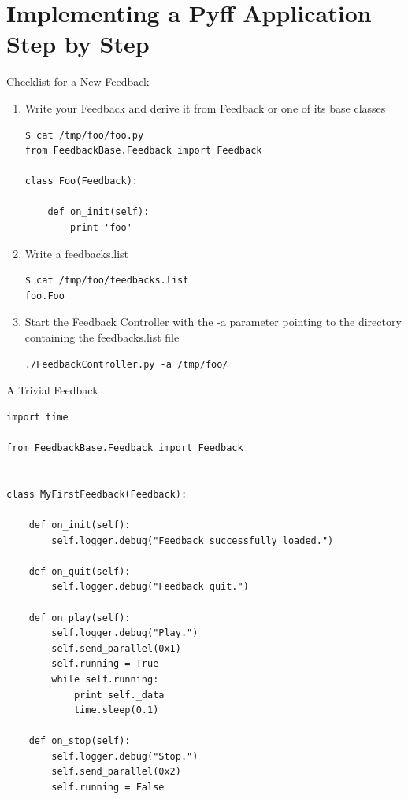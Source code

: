 \documentclass{beamer}
\begin{document}
\section{Implementing a Pyff Application Step by Step}
\begin{frame}[fragile]{Checklist for a New Feedback}
    \begin{enumerate}
        \item Write your Feedback and derive it from \alert{Feedback} or one of
            its base classes
            \begin{lstlisting}
$ cat /tmp/foo/foo.py
from FeedbackBase.Feedback import Feedback

class Foo(Feedback):

    def on_init(self):
        print 'foo'
            \end{lstlisting}
        \pause
        \item Write a \alert{feedbacks.list}
            \begin{lstlisting}
$ cat /tmp/foo/feedbacks.list
foo.Foo
            \end{lstlisting}
        \pause
        \item Start the Feedback Controller with the \alert{-a} parameter
            pointing to the directory containing the \alert{feedbacks.list}
            file
            \begin{lstlisting}
./FeedbackController.py -a /tmp/foo/
            \end{lstlisting}
    \end{enumerate}
\end{frame}


\begin{frame}[fragile]{A Trivial Feedback}
    \begin{lstlisting}
import time

from FeedbackBase.Feedback import Feedback


class MyFirstFeedback(Feedback):

    def on_init(self):
        self.logger.debug("Feedback successfully loaded.")

    def on_quit(self):
        self.logger.debug("Feedback quit.")

    def on_play(self):
        self.logger.debug("Play.")
        self.send_parallel(0x1)
        self.running = True
        while self.running:
            print self._data
            time.sleep(0.1)

    def on_stop(self):
        self.logger.debug("Stop.")
        self.send_parallel(0x2)
        self.running = False

    \end{lstlisting}
\end{frame}
\end{document}
